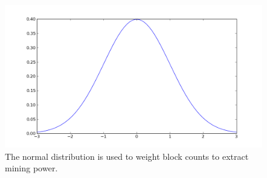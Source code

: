 \begin{figure}[h]
\begin{center}
  \includegraphics[width=1\columnwidth]{figures/normal.png}
  \caption{The normal distribution is used to weight block counts to extract mining power.}
  \label{fig:mining-power}
  \end{center}
\end{figure}
